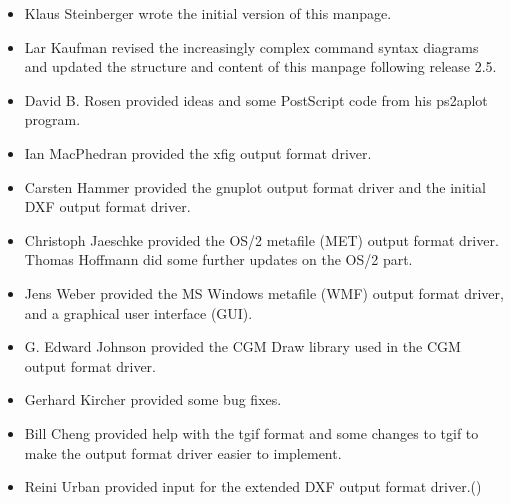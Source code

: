 \documentclass[english,a4paper]{article}
\begin{document}
\begin{itemize}\setlength{\itemsep}{0cm}

  \item Klaus Steinberger 
     wrote the initial version of this manpage.

  \item Lar Kaufman revised the increasingly complex
     command syntax diagrams and updated the structure and content of this
     manpage following release 2.5.

  \item David B. Rosen  provided ideas and some PostScript
     code from his ps2aplot program.

  \item Ian MacPhedran  provided the xfig
     output format driver.

  \item Carsten Hammer  provided the
     gnuplot output format driver and the initial DXF output format driver.

  \item Christoph Jaeschke provided the OS/2 metafile (MET) output format driver.
  Thomas Hoffmann  did some further updates on the OS/2 part.

  \item Jens Weber  provided the MS Windows metafile (WMF)
     output format driver, and a graphical user interface (GUI).

  \item G. Edward Johnson  provided the CGM Draw library
     used in the CGM output format driver.

  \item Gerhard Kircher  provided some bug
     fixes.

  \item Bill Cheng  provided help with the tgif
     format and some changes to tgif to make the output format driver easier to implement.

  \item Reini Urban  provided input for the
     extended DXF output format driver.()


\end{itemize}
\end{document}
